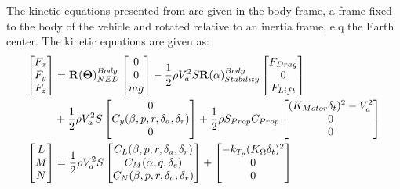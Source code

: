 The kinetic equations presented from \citep{beard2012small} are given in the body frame, a frame fixed to the body of the vehicle and rotated relative to an inertia frame, e.q the Earth center. The kinetic equations are given as:
\begin{subequations}
\label{eq:kinetics}
\begin{align}
\begin{bmatrix}
F_x \\
F_y \\
F_z
\end{bmatrix}
&= \mathbf{R}(\mathbf{\Theta})^{Body}_{NED}\begin{bmatrix}
0 \\
0 \\
mg
\end{bmatrix} - \frac{1}{2} \rho V_a^2 S \mathbf{R}(\alpha)_{Stability}^{Body}\begin{bmatrix}
F_{Drag} \\
0 \\
F_{Lift}
\end{bmatrix}\\ &+ \frac{1}{2} \rho V_a^2 S \begin{bmatrix}
0 \\
C_y(\beta,p,r,\delta_a,\delta_r) \notag\\
0
\end{bmatrix} + \frac{1}{2} \rho S_{Prop} C_{Prop} \begin{bmatrix}
(K_{Motor}\delta_t)^2-V_a^2 \\
0 \\
0
\end{bmatrix}\\
\begin{bmatrix}
 L \\
 M \\
 N 
 \end{bmatrix} &= \frac{1}{2} \rho V_a^2S\begin{bmatrix}
 C_L(\beta,p,r,\delta_a,\delta_r) \\
 C_M(\alpha,q,\delta_e) \\
 C_N(\beta,p,r,\delta_a,\delta_r)
 \end{bmatrix} + \begin{bmatrix}
 -k_{T_p}(K_\Omega\delta_t)^2 \\
 0 \\
 0
 \end{bmatrix}
\end{align}
\end{subequations}
